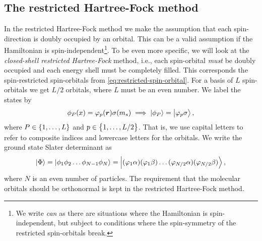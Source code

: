         \subsection{The restricted Hartree-Fock method}
            \label{subsec:rhf}
            In the restricted Hartree-Fock method we make the assumption that
            each spin-direction is doubly occupied by an orbital.
            This can be a valid assumption if the Hamiltonian is
            spin-independent\footnote{%
                We write \emph{can} as there are situations where the
                Hamiltonian is spin-independent, but subject to conditions where
                the spin-symmetry of the restricted spin-orbitals break.
            }.
            To be even more specific, we will look at the \emph{closed-shell
            restricted Hartree-Fock} method, i.e., each spin-orbital \emph{must}
            be doubly occupied and each energy shell must be completely filled.
            This corresponds the spin-restricted spin-orbitals from
            \autoref{eq:restricted-spin-orbital}.
            For a basis of $L$ spin-orbitals we get $L/2$ orbitals, where $L$
            must be an even number.
            We label the states by
            \begin{align}
                \phi_{P}(x) = \varphi_p(\boldsymbol{r}) \sigma(m_s)
                \implies
                \ket{\phi_P} = \ket{\varphi_p\sigma},
            \end{align}
            where $P \in \left\{ 1, \dots, L \right\}$ and $p \in \left\{ 1, \dots, L / 2 \right\}$.
            That is, we use capital letters to refer to composite indices and
            lowercase letters for the orbitals.
            We write the ground state Slater determinant as
            \begin{align}
                \ket{\Phi} = \ket{\phi_1 \phi_2 \dots \phi_{N - 1} \phi_N}
                = \ket{
                    (\varphi_1 \alpha)
                    (\varphi_1 \beta)
                    \dots
                    (\varphi_{N / 2} \alpha)
                    (\varphi_{N / 2}\beta)
                },
            \end{align}
            where $N$ is an even number of particles.
            The requirement that the molecular orbitals should be orthonormal is
            kept in the restricted Hartree-Fock method.
